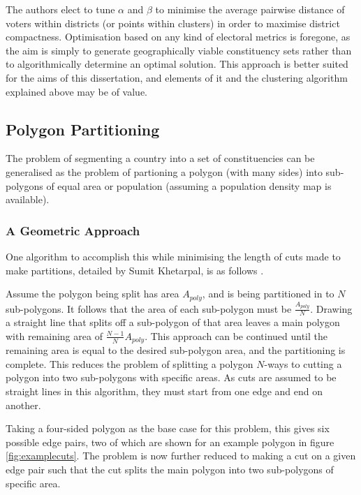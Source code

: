 \documentclass{article}
\begin{document}
The authors elect to tune $\alpha$ and $\beta$ to minimise the average pairwise distance of voters within districts (or points within clusters) in order to maximise district compactness.
Optimisation based on any kind of electoral metrics is foregone, as the aim is simply to generate geographically viable constituency sets rather than to algorithmically determine an
optimal solution. This approach is better suited for the aims of this dissertation, and elements of it and the clustering algorithm explained above may be of value.

\subsection{Polygon Partitioning}

The problem of segmenting a country into a set of constituencies can be generalised as the problem of partioning a polygon (with many sides) into sub-polygons of
equal area or population (assuming a population density map is available). 

\subsubsection{A Geometric Approach}

One algorithm to accomplish this while minimising the length of cuts made to make partitions, detailed by Sumit Khetarpal, is as follows \cite{khetarpal}.

Assume the polygon being split has area $A_{poly}$, and is being partitioned in to $N$ sub-polygons. It follows that the area of each sub-polygon must be \(\frac{A_{poly}}{N}\).
Drawing a straight line that splits off a sub-polygon of that area leaves a main polygon with remaining area of \(\frac{N-1}{N}A_{poly}\). This approach can be continued until
the remaining area is equal to the desired sub-polygon area, and the partitioning is complete. This reduces the problem of splitting a polygon $N$-ways to cutting a polygon into 
two sub-polygons with specific areas. As cuts are assumed to be straight lines in this algorithm, they must start from one edge and end on another.

Taking a four-sided polygon as the base case for this problem, this gives six possible edge pairs, two of which are shown for an example polygon in figure \ref{fig:examplecuts}.
The problem is now further reduced to making a cut on a given edge pair such that the cut splits the main polygon into two sub-polygons of specific area.
\end{document}
